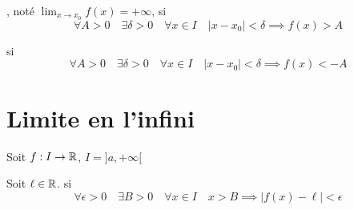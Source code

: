 \begin{frame}

\begin{mydefinition}
, noté  $\displaystyle\lim_{x\to x_0}f(x)=+\infty$, si 
\[
\forall A>0 \quad \exists \delta>0 \quad \forall x\in I \quad \vert x-x_0\vert <\delta \implies f(x)>A
\]

\end{mydefinition}

\pause

   si 
\[
\forall A>0 \quad \exists \delta>0 \quad \forall x\in I \quad \vert x-x_0\vert <\delta \implies f(x)<-A
\]


\pause
{}
  
\end{frame}



\section{Limite en l'infini}

\begin{frame}

Soit $f:I\to \mathbb{R}$,   $I=]a,+\infty[$

\pause

\begin{mydefinition}
Soit $\ell\in\mathbb{R}$.  si 
\[
\forall \epsilon>0 \quad \exists B>0 \quad \forall x\in I \quad x>B \implies \vert f(x)-\ell\vert <\epsilon
\]
\end{mydefinition}


\end{frame}




